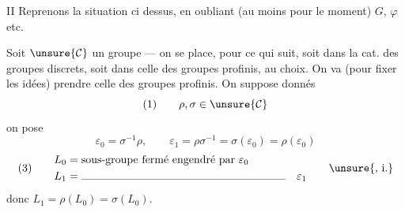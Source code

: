 


II Reprenons la situation ci dessus, en oubliant (au moins pour le moment) $G$, $\varphi$ etc.


Soit $\unsure{\mathcal{C}}$ un groupe --- on se place, pour ce qui suit, soit dans la cat. des groupes discrets, soit dans celle des groupes profinis, au choix. On va (pour fixer les idées) prendre celle des groupes profinis. On suppose donnés
\[
(1)\qquad \rho,\sigma\in\unsure{\mathcal{C}}
\]
\margin{[\unsure{i.e. on a entre} $\varepsilon_0=\ell'_0$, $\sigma=\ell'_1$ et $\rho^{-1}=\ell'_\infty$ avec relation (2) $\ell'_\infty\ell'_1\ell'_0=1$]}
on pose
\[
\varepsilon_0=\sigma^{-1}\rho,\qquad
\varepsilon_1=\rho\sigma^{-1}=\sigma(\varepsilon_0)=\rho(\varepsilon_0)
\]
\[
(3)\qquad
\begin{aligned}
L_0&=\text{sous-groupe fermé engendré par }\varepsilon_0\\
L_1&=\rule{6.5cm}{0.3pt}\quad\varepsilon_1
\end{aligned}
\qquad\unsure{\text{, i.}}
\]
donc $L_1=\rho(L_0)=\sigma(L_0)$.


